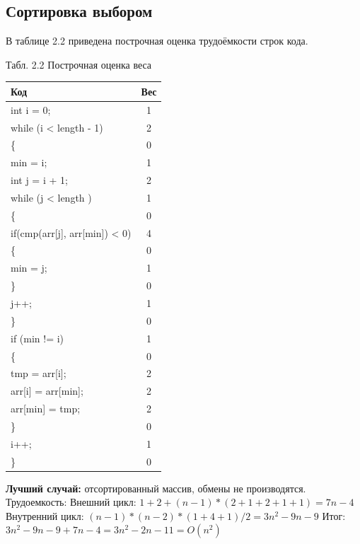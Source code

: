 \documentclass{report}
\begin{document}
\subsection{Сортировка выбором}
В таблице 2.2 приведена построчная оценка трудоёмкости строк кода.
\begin{center}
Табл. 2.2 Построчная оценка веса\newline
	\begin{tabular}{|l c|} 
 	\hline
	Код & Вес \\ [0.5ex] 
 	\hline
	int i = 0; & 1\\
 	\hline
	while (i < length - 1) & 2\\
	\hline
	\{ & 0\\
	\hline
	min = i; & 1\\
	\hline
	int j = i + 1; & 2\\
 	\hline
	while (j < length ) & 1\\
	\hline
	\{ & 0\\	
	\hline
	if(cmp(arr[j], arr[min]) < 0) & 4\\
	\hline
	\{ & 0\\
    \hline
    min = j; & 1\\
    \hline
    \} & 0\\
	\hline
	j++; & 1\\
	\hline
	\} & 0\\
	\hline
	if (min != i) & 1\\
	\hline
	\{ & 0\\
	\hline
	tmp = arr[i]; & 2\\
	\hline
    arr[i] = arr[min]; & 2\\
    \hline
    arr[min] = tmp; & 2\\
    \hline
	\} & 0\\
	\hline
	i++; & 1\\
	\hline
	\} & 0\\
	\hline
	\end{tabular}
\end{center}
\hspace*{5mm}
\textbf{Лучший случай:} отсортированный массив, обмены не производятся.
\newline
Трудоемкость: 
\newline
Внешний цикл: $1 + 2 + (n - 1) * (2 + 1 + 2 + 1 + 1) = 7n - 4$
\newline
Внутренний цикл: $(n - 1) * (n - 2) * (1 + 4 + 1) / 2 = 3n^2 -9n -9$
\newline
Итог: $3n^2 -9n -9 + 7n - 4 = 3n^2 -2n - 11 = O(n^2)$
\newline
\end{document}
